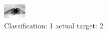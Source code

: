 \begin{figure}[h!]
\begin{center}
\includegraphics[width=0.60\columnwidth]{figures/ID2343_class_1_target_2.png}
\end{center}
\caption{ Classification: 1 actual target: 2}
\label{fig:ID2343_class_1_target_2}
\end{figure}
